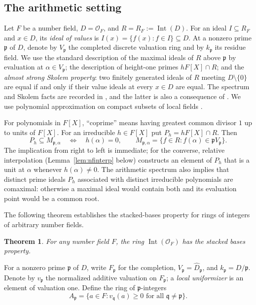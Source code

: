 \documentclass[11pt]{amsart}
\newtheorem{theorem}{Theorem}[section]
\theoremstyle{definition}
\theoremstyle{remark}
\newcommand{\Int}{\operatorname{Int}}
\begin{document}
\subsection{The arithmetic setting}
Let $F$ be a number field, $D=\mathcal O_F$, and $R=R_F:=\Int(D)$.
For an ideal $I\subseteq R_F$ and $x\in D$, its \emph{ideal of values} is
$I(x)=\{f(x):f\in I\}\subseteq D$.
At a nonzero prime $\mathfrak p$ of $D$, denote by $V_{\mathfrak p}$
the completed discrete valuation ring and by $k_{\mathfrak p}$ its
residue field. We use the standard description of the maximal ideals
of $R$ above $\mathfrak p$ by evaluation at $\alpha\in V_{\mathfrak p}$;
the description of height-one primes $hF[X]\cap R$; and the \emph{almost
strong Skolem property}: two finitely generated ideals of $R$ meeting
$D\setminus\{0\}$ are equal if and only if their value ideals at every
$x\in D$ are equal. The spectrum and Skolem facts are recorded in
\cite[Chapters VIII--IX]{Chabert2025}, and the latter is also a
consequence of \cite[Theorem~2.8]{Park2021}. We use polynomial
approximation on compact subsets of local fields
\cite{BhargavaKedlaya1999}.

For polynomials in $F[X]$, ``coprime'' means having greatest common divisor $1$ up to units of $F[X]$. For an irreducible $h\in F[X]$ put $P_h=hF[X]\cap R$. Then
\[
 P_h\subseteq M_{\mathfrak p,\alpha}
 \quad\Longleftrightarrow\quad h(\alpha)=0,
 \qquad
 M_{\mathfrak p,\alpha}=\{f\in R:f(\alpha)\in\mathfrak pV_{\mathfrak p}\}.
\]
The implication from right to left is immediate; for the converse,
relative interpolation (Lemma~\ref{lem:nfinterp} below) constructs
an element of $P_h$ that is a unit at $\alpha$ whenever
$h(\alpha)\ne0$. The arithmetic spectrum also implies that distinct
prime ideals $P_h$ associated with distinct irreducible polynomials
are comaximal: otherwise a maximal ideal would contain both and
its evaluation point would be a common root.

The following theorem establishes the stacked-bases property for rings of integers of arbitrary number fields.
\begin{theorem}\label{thm:numberfield}
For any number field $F$, the ring $\Int(\mathcal O_F)$ has the
stacked bases property.
\end{theorem}

For a nonzero prime $\mathfrak p$ of $D$, write
$F_{\mathfrak p}$ for the completion,
$V_{\mathfrak p}=\widehat D_{\mathfrak p}$, and
$k_{\mathfrak p}=D/\mathfrak p$. Denote by
$v_{\mathfrak p}$ the normalized additive valuation on
$F_{\mathfrak p}$; a \emph{local uniformizer} is an element
of valuation one.
Define the ring of $\mathfrak p$-integers
\[
A_{\mathfrak p}=
\{a\in F:v_{\mathfrak q}(a)\ge0 \text{ for all }
\mathfrak q\ne\mathfrak p\}.
\]
\end{document}
